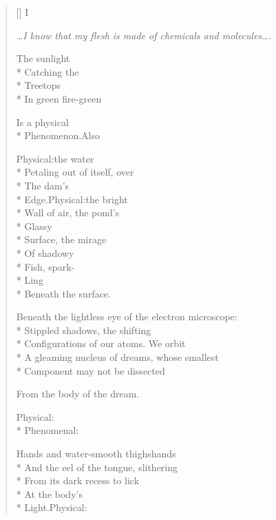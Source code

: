 \begingroup
\setlength\epigraphwidth{9cm}
\setlength\beforeepigraphskip{0cm}
\setlength\afterepigraphskip{0cm}
 
\label{ch:the_body_of_the_dream}
\settowidth{\versewidth}{Vision:\quad the bright wall of my flesh, here, beneath my hand,}
\begin{verse}[\versewidth]
\hspace{0.45\versewidth} I
\epigraph{ \ldots \textit{I know that my flesh is made of chemicals and molecules}\ldots .}{}
The sunlight\\*
Catching the\\*
Treetops\\*
In green fire-green

Is a physical\\*
Phenomenon.\quad Also

Physical:\quad the water\\*
Petaling out of itself, over\\*
The dam's\\*
Edge.\quad Physical:\quad the bright\\*
Wall of air, the pond's\\*
Glassy\\*
Surface,    the mirage\\*
Of shadowy\\*
Fish, spark-\\*
Ling\\*
Beneath the surface.

\starbreak

Beneath the lightless eye of the electron microscope:\\*
Stippled shadows, the shifting\\*
Configurations of our atoms.   We orbit\\*
A gleaming nucleus of dreams, whose smallest\\*
Component may not be dissected

From the body of the dream.

\starbreak

Physical:\\*
Phenomenal:

Hands and water-smooth thighs\quad hands\\*
And the eel of the tongue, slithering\\*
From its dark recess to lick\\*
At the body's\\*
Light.\quad Physical:


\end{verse}
